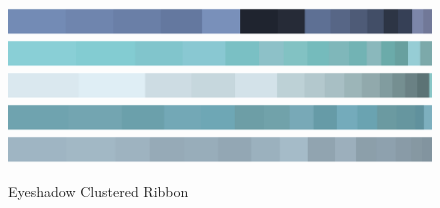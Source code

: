 \documentclass{article}
\begin{document}
\begin{figure}[htbp]
    \centering
        {\includegraphics[width=\textwidth]{main_files/figure-latex/15_3_orange_marilyn_eyeshadow_color_ribbon.pdf}}
        {\includegraphics[width=\textwidth]{main_files/figure-latex/18_3_red_marilyn_eyeshadow_color_ribbon.pdf}}
        {\includegraphics[width=\textwidth]{main_files/figure-latex/21_3_turq_marilyn_eyeshadow_color_ribbon.pdf}}
        {\includegraphics[width=\textwidth]{main_files/figure-latex/24_3_blue_marilyn_eyeshadow_color_ribbon.pdf}}
        {\includegraphics[width=\textwidth]{main_files/figure-latex/27_3_eggblue_marilyn_eyeshadow_color_ribbon.pdf}}
    \caption{Eyeshadow Clustered Ribbon}
\end{figure}
\end{document}
